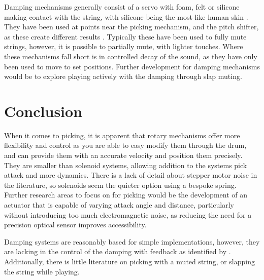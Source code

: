 \documentclass[12pt, a4paper, onecolumn]{IEEEtran}
\begin{document}
        Damping mechanisms generally consist of a servo with foam, felt or silicone making contact with the string, with silicone being the most like human skin \cite{VUW_Chordophones}.
        They have been used at points near the picking mechanism, and the pitch shifter, as these create different results \cite{VUW_Chordophones}.
        Typically these have been used to fully mute strings, however, it is possible to partially mute, with lighter touches.
        Where these mechanisms fall short is in controlled decay of the sound, as they have only been used to move to set positions.
        Further development for damping mechanisms would be to explore playing actively with the damping through slap muting.


    \section{Conclusion}
        When it comes to picking, it is apparent that rotary mechanisms offer more flexibility and control as you are able to easy modify them through the drum, and can provide them with an accurate velocity and position them precisely. 
        They are smaller than solenoid systems, allowing addition to the systems pick attack and more dynamics.
        There is a lack of detail about stepper motor noise in the literature, so solenoids seem the quieter option using a bespoke spring.
        Further research areas to focus on for picking would be the development of an actuator that is capable of varying attack angle and distance, particularly without introducing too much electromagnetic noise, as reducing the need for a precision optical sensor improves accessibility.

        Damping systems are reasonably based for simple implementations, however, they are lacking in the control of the damping with feedback as identified by \cite{VUW_Chordophones}.
        Additionally, there is little literature on picking with a muted string, or slapping the string while playing.

    \printbibliography
\end{document}
